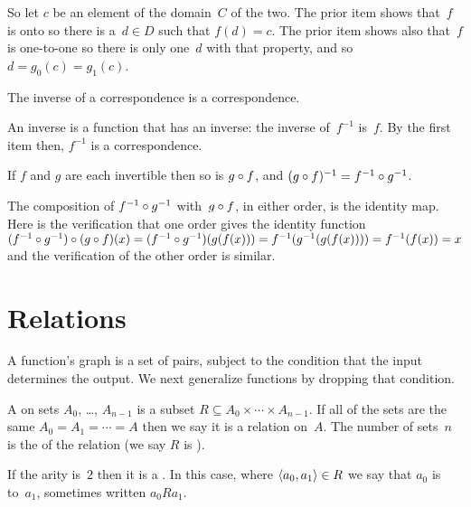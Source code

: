 \documentclass{ibl}  %
\begin{document}
\begin{problem}
\begin{exes}
\begin{answer}
  So let $c$ be an element of the domain~$C$ of the two.
  The prior item shows that~$f$ is onto so there is a~$d\in D$ such that
  $f(d)=c$.
  The prior item shows also that~$f$ is one-to-one so there is only 
  one~$d$ with that property, and so $d=g_0(c)=g_1(c)$.  
\end{answer}
\begin{exercise} 
  The inverse of a correspondence is a correspondence.  
\end{exercise}
\begin{answer}
  An inverse is a function that has an inverse: the inverse of~$f^{-1}$
  is~$f$.
  By the first item then, $f^{-1}$ is a correspondence.  
\end{answer}
\begin{exercise} 
  If $f$ and $g$ are each invertible then so is 
  $g\mathbin{\circ} f$, and $(g\mathbin{\circ} f)^{-1}=f^{-1}\mathbin{\circ} g^{-1}$.
\end{exercise}
\begin{answer}
  The composition of $f^{-1}\mathbin{\circ} g^{-1}$ with~$g\mathbin{\circ} f$,
  in either order, is the identity map.
  Here is the verification that one order gives the identity function   
  $(f^{-1}\mathbin{\circ} g^{-1})\mathbin{\circ} (g\mathbin{\circ} f)(x)
  =(f^{-1}\mathbin{\circ} g^{-1})(g(f(x)))
  =f^{-1}(g^{-1}(g(f(x))))
  =f^{-1}(f(x))=x$
  and the verification of the other order is similar.  
\end{answer}
\end{exes}
\end{problem}





\section{Relations}
A function's graph is a set of pairs,
subject to the condition that the input determines the output.
We next generalize functions by dropping that condition.  

\begin{df}
A  on sets $A_0$, \ldots, $A_{n-1}$ is a subset
$R\subseteq A_0\times \cdots \times A_{n-1}$. 
If all of the sets are the same $A_0=A_1=\cdots =A$
then we say it is a relation on~$A$.
The number of sets~$n$ is the  of the relation
(we say $R$ is ).

If the arity is~$2$ then it is a .
In this case, where $\langle a_0,a_1\rangle\in R$ we say 
that $a_0$ is~ to~$a_1$,
sometimes written $a_0Ra_1$.
\end{df}
\end{document}
